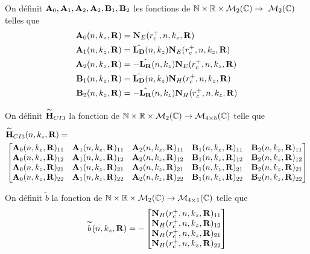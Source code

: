     \begin{defn}
      On définit \(\mathbf{A}_0,\mathbf{A}_1,\mathbf{A}_2,\mathbf{A}_2,\mathbf{B}_1,\mathbf{B}_2\) les fonctions de \(\mathbb N \times \mathbb R \times \mathcal{M}_2(\mathbb C) \rightarrow \ \mathcal{M}_2(\mathbb C)\) telles que        
      \begin{align*}
        \mathbf{A}_0(n,k_z,\mathbf{R}) &= \mathbf{N}_E(r_c^+,n,k_z,\mathbf{R})
        \\
        \mathbf{A}_1(n,k_z,\mathbf{R}) &= \hat{\mathbf{L_D}}(n,k_z)\mathbf{N}_E(r_c^+,n,k_z,\mathbf{R})
        \\
        \mathbf{A}_2(n,k_z,\mathbf{R}) &= -\hat{\mathbf{L_R}}(n,k_z)\mathbf{N}_E(r_c^+,n,k_z,\mathbf{R})
        \\
        \mathbf{B}_1(n,k_z,\mathbf{R}) &= \hat{\mathbf{L_D}}(n,k_z)\mathbf{N}_H(r_c^+,n,k_z,\mathbf{R})
        \\
        \mathbf{B}_2(n,k_z,\mathbf{R}) &= -\hat{\mathbf{L_R}}(n,k_z)\mathbf{N}_H(r_c^+,n,k_z,\mathbf{R})            
      \end{align*}

      On définit \(\overset{\thicksim}{\mathbf{H}}_{CI3}\) la fonction de \(\mathbb N \times \mathbb R \times \mathcal{M}_2(\mathbb C) \rightarrow \mathcal{M}_{4\times5}(\mathbb C)\) telle que
      \begin{align*}
        & \overset{\thicksim}{\mathbf{H}}_{CI3}(n,k_z,\mathbf{R}) =  \\ &
        \begin{bmatrix}
          \mathbf{A}_0(n,k_z,\mathbf{R})_{11} & \mathbf{A}_1(n,k_z,\mathbf{R})_{11} & \mathbf{A}_2(n,k_z,\mathbf{R})_{11} & \mathbf{B}_1(n,k_z,\mathbf{R})_{11} & \mathbf{B}_2(n,k_z,\mathbf{R})_{11}
          \\
          \mathbf{A}_0(n,k_z,\mathbf{R})_{12} & \mathbf{A}_1(n,k_z,\mathbf{R})_{12} & \mathbf{A}_2(n,k_z,\mathbf{R})_{12} & \mathbf{B}_1(n,k_z,\mathbf{R})_{12} & \mathbf{B}_2(n,k_z,\mathbf{R})_{12}
          \\
          \mathbf{A}_0(n,k_z,\mathbf{R})_{21} & \mathbf{A}_1(n,k_z,\mathbf{R})_{21} & \mathbf{A}_2(n,k_z,\mathbf{R})_{21} & \mathbf{B}_1(n,k_z,\mathbf{R})_{21} & \mathbf{B}_2(n,k_z,\mathbf{R})_{21}
          \\
          \mathbf{A}_0(n,k_z,\mathbf{R})_{22} & \mathbf{A}_1(n,k_z,\mathbf{R})_{22} & \mathbf{A}_2(n,k_z,\mathbf{R})_{22} & \mathbf{B}_1(n,k_z,\mathbf{R})_{22} & \mathbf{B}_2(n,k_z,\mathbf{R})_{22}
        \end{bmatrix}
      \end{align*}

      On définit \(\tilde{b}\) la fonction de \(\mathbb N \times \mathbb R \times \mathcal{M}_2(\mathbb C) \rightarrow \mathcal{M}_{4\times1}(\mathbb C)\) telle que
      \begin{equation*}
        \overset{\thicksim}{b}(n,k_z,\mathbf{R}) = -
        \begin{bmatrix}
          \mathbf{N}_H(r_c^+,n,k_z,\mathbf{R})_{11}
          \\
          \mathbf{N}_H(r_c^+,n,k_z,\mathbf{R})_{12}
          \\
          \mathbf{N}_H(r_c^+,n,k_z,\mathbf{R})_{21}
          \\
          \mathbf{N}_H(r_c^+,n,k_z,\mathbf{R})_{22}
        \end{bmatrix}
      \end{equation*}
    \end{defn}

